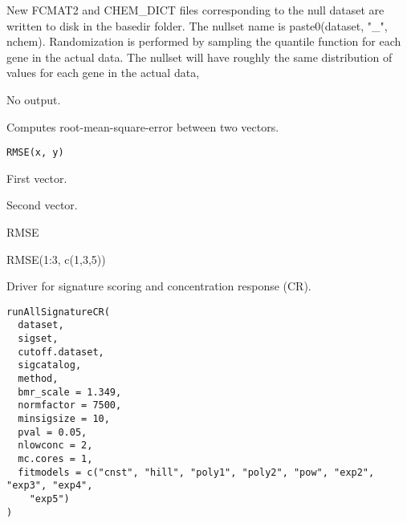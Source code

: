 \documentclass[letterpaper]{book}
\begin{document}
%
\begin{Details}\relax
New FCMAT2 and CHEM\_DICT files corresponding to the null dataset are written
to disk in the basedir folder. The nullset name is paste0(dataset, "\_", nchem).
Randomization is performed by sampling the quantile function for each gene in
the actual data. The nullset will have roughly the same distribution of values
for each gene in the actual data,
\end{Details}
%
\begin{Value}
No output.
\end{Value}
%
\begin{Description}\relax
Computes root-mean-square-error between two vectors.
\end{Description}
%
\begin{Usage}
\begin{verbatim}
RMSE(x, y)
\end{verbatim}
\end{Usage}
%
\begin{Arguments}
\begin{ldescription}
\item[\code{x}] First vector.

\item[\code{y}] Second vector.
\end{ldescription}
\end{Arguments}
%
\begin{Value}
RMSE
\end{Value}
%
\begin{Examples}
\begin{ExampleCode}
RMSE(1:3, c(1,3,5))
\end{ExampleCode}
\end{Examples}
%
\begin{Description}\relax
Driver for signature scoring and concentration response (CR).
\end{Description}
%
\begin{Usage}
\begin{verbatim}
runAllSignatureCR(
  dataset,
  sigset,
  cutoff.dataset,
  sigcatalog,
  method,
  bmr_scale = 1.349,
  normfactor = 7500,
  minsigsize = 10,
  pval = 0.05,
  nlowconc = 2,
  mc.cores = 1,
  fitmodels = c("cnst", "hill", "poly1", "poly2", "pow", "exp2", "exp3", "exp4",
    "exp5")
)
\end{verbatim}
\end{Usage}
\end{document}
